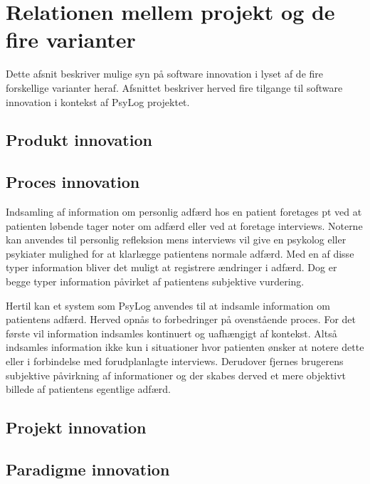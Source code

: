 \section{Relationen mellem projekt og de fire varianter}
Dette afsnit beskriver mulige syn på software innovation i lyset af de fire forskellige varianter heraf\citet[Afsnit 5.1, Side 30-31]{art:essence}.
Afsnittet beskriver herved fire tilgange til software innovation i kontekst af PsyLog projektet.

\subsection{Produkt innovation}

\subsection{Proces innovation}
Indsamling af information om personlig adfærd hos en patient foretages pt ved at patienten løbende tager noter om adfærd eller ved at foretage interviews.
Noterne kan anvendes til personlig refleksion mens interviews vil give en psykolog eller psykiater mulighed for at klarlægge patientens normale adfærd.
Med en af disse typer information bliver det muligt at registrere ændringer i adfærd.
Dog er begge typer information påvirket af patientens subjektive vurdering.

Hertil kan et system som PsyLog anvendes til at indsamle information om patientens adfærd.
Herved opnås to forbedringer på ovenstående proces.
For det første vil information indsamles kontinuert og uafhængigt af kontekst.
Altså indsamles information ikke kun i situationer hvor patienten ønsker at notere dette eller i forbindelse med forudplanlagte interviews.
Derudover fjernes brugerens subjektive påvirkning af informationer og der skabes derved et mere objektivt billede af patientens egentlige adfærd.

\subsection{Projekt innovation}

\subsection{Paradigme innovation}
